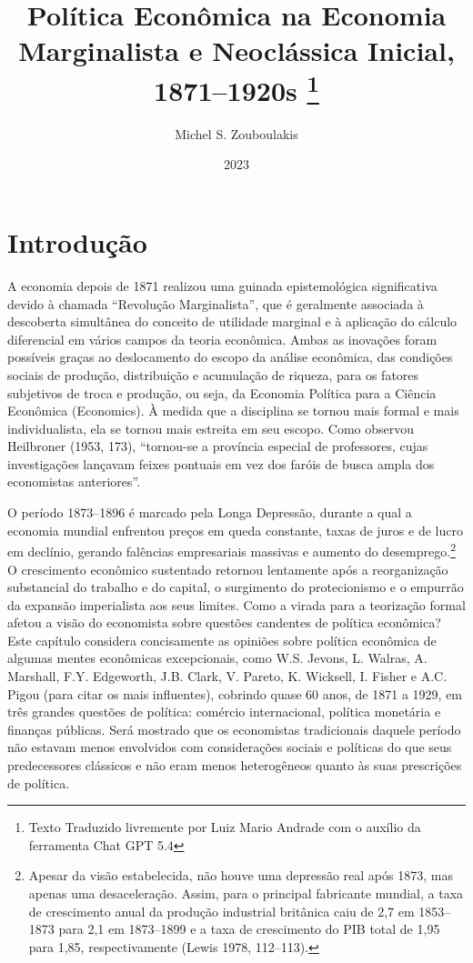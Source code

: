 \documentclass[12pt]{article}
\title{Política Econômica na Economia Marginalista e Neoclássica Inicial, 1871–1920s \thanks{Texto Traduzido livremente por Luiz Mario Andrade com o auxílio da ferramenta Chat GPT 5.4}}
\author{Michel S. Zouboulakis}
\date{2023}
\begin{document}
\maketitle

\section*{Introdução}

A economia depois de 1871 realizou uma guinada epistemológica significativa devido à chamada “Revolução Marginalista”, que é geralmente associada à descoberta simultânea do conceito de utilidade marginal e à aplicação do cálculo diferencial em vários campos da teoria econômica. Ambas as inovações foram possíveis graças ao deslocamento do escopo da análise econômica, das condições sociais de produção, distribuição e acumulação de riqueza, para os fatores subjetivos de troca e produção, ou seja, da Economia Política para a Ciência Econômica (Economics). À medida que a disciplina se tornou mais formal e mais individualista, ela se tornou mais estreita em seu escopo. Como observou Heilbroner (1953, 173), “tornou-se a província especial de professores, cujas investigações lançavam feixes pontuais em vez dos faróis de busca ampla dos economistas anteriores”.

O período 1873–1896 é marcado pela Longa Depressão, durante a qual a economia mundial enfrentou preços em queda constante, taxas de juros e de lucro em declínio, gerando falências empresariais massivas e aumento do desemprego.\footnote{Apesar da visão estabelecida, não houve uma depressão real após 1873, mas apenas uma desaceleração. Assim, para o principal fabricante mundial, a taxa de crescimento anual da produção industrial britânica caiu de 2,7 em 1853–1873 para 2,1 em 1873–1899 e a taxa de crescimento do PIB total de 1,95 para 1,85, respectivamente (Lewis 1978, 112–113).} O crescimento econômico sustentado retornou lentamente após a reorganização substancial do trabalho e do capital, o surgimento do protecionismo e o empurrão da expansão imperialista aos seus limites. Como a virada para a teorização formal afetou a visão do economista sobre questões candentes de política econômica? Este capítulo considera concisamente as opiniões sobre política econômica de algumas mentes econômicas excepcionais, como W.S. Jevons, L. Walras, A. Marshall, F.Y. Edgeworth, J.B. Clark, V. Pareto, K. Wicksell, I. Fisher e A.C. Pigou (para citar os mais influentes), cobrindo quase 60 anos, de 1871 a 1929, em três grandes questões de política: comércio internacional, política monetária e finanças públicas. Será mostrado que os economistas tradicionais daquele período não estavam menos envolvidos com considerações sociais e políticas do que seus predecessores clássicos e não eram menos heterogêneos quanto às suas prescrições de política.
\end{document}

